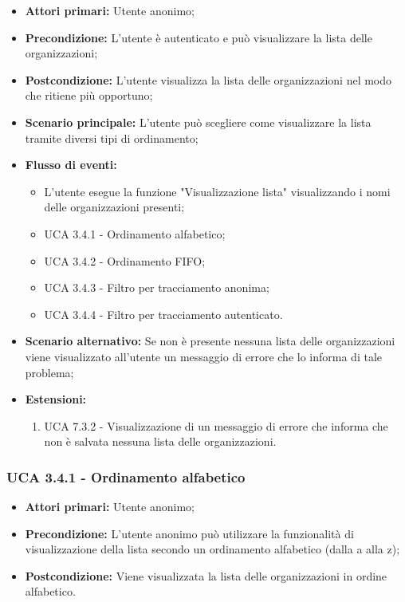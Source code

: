 \begin{itemize} 
	\item \textbf{Attori primari:} Utente anonimo;
	\item \textbf{Precondizione:}  L'utente è autenticato e può visualizzare la lista delle organizzazioni;
	\item \textbf{Postcondizione:} L'utente visualizza la lista delle organizzazioni nel modo che ritiene più opportuno;
	\item \textbf{Scenario principale:}	L'utente può scegliere come visualizzare la lista tramite diversi tipi di ordinamento;
	\item \textbf{Flusso di eventi:}
	\begin{itemize}
		\item L'utente esegue la funzione "Visualizzazione lista" visualizzando i nomi delle organizzazioni presenti;
		\item UCA 3.4.1 - Ordinamento alfabetico;
		\item UCA 3.4.2 - Ordinamento FIFO;
		\item UCA 3.4.3 - Filtro per tracciamento anonima;
		\item UCA 3.4.4 - Filtro per tracciamento autenticato.
	\end{itemize}
	\item \textbf{Scenario alternativo:} Se non è presente nessuna lista delle organizzazioni viene visualizzato all'utente un messaggio di errore che lo informa di tale problema;
	\item \textbf{Estensioni:}
	\begin{enumerate}
		\item UCA 7.3.2 - Visualizzazione di un messaggio di errore che informa che non è salvata nessuna lista delle organizzazioni.
	\end{enumerate}
\end{itemize}

\subsubsection{UCA 3.4.1 - Ordinamento alfabetico}%
\begin{itemize}
	\item \textbf{Attori primari:} Utente anonimo;
	\item \textbf{Precondizione:} L'utente anonimo può utilizzare la funzionalità di visualizzazione della lista secondo un ordinamento alfabetico (dalla a alla z);
	\item \textbf{Postcondizione:} Viene visualizzata la lista delle organizzazioni in ordine alfabetico.
\end{itemize}

